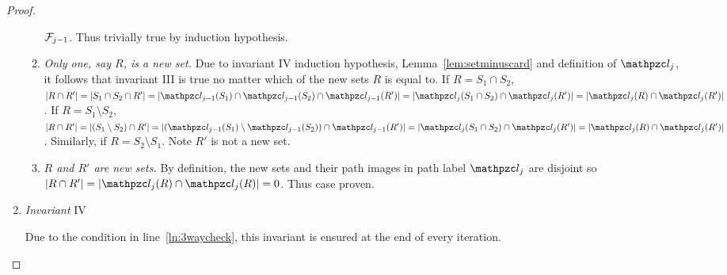 \begin{proof}
\begin{enumerate}[\xbullet]
\begin{enumerate}[{III}a $|$]
      ${\cal F}_{j-1}$. Thus trivially true by induction hypothesis.
    \item {\em Only one, say $R$, is a new set.} Due to invariant IV
      induction hypothesis, Lemma~\ref{lem:setminuscard} and
      definition of $\cl_j$, it follows that invariant III is true no
      matter which of the new sets $R$ is equal to. If $R = S_1 \cap
      S_2$, $|R \cap R'| = |S_1 \cap S_2 \cap R'| = |\cl_{j-1}(S_1)
      \cap \cl_{j-1}(S_2) \cap \cl_{j-1}(R')| = |\cl_j(S_1 \cap S_2)
      \cap \cl_j(R')| = |\cl_j(R) \cap \cl_j(R')|$.  If $R = S_1
      \setminus S_2$, $|R \cap R'| = |(S_1 \setminus S_2) \cap R'| =
      |(\cl_{j-1}(S_1) \setminus \cl_{j-1}(S_2)) \cap \cl_{j-1}(R')| =
      |\cl_{j}(S_1 \cap S_2) \cap \cl_{j}(R')| = |\cl_{j}(R) \cap
      \cl_{j}(R')|$. Similarly, if $R = S_2 \setminus
      S_1$. Note $R'$ is not a new set.\\

    \item {\em $R$ and $R'$ are new sets.} By definition, the new sets
      and their path images in path label $\cl_j$ are disjoint so $|R
      \cap R'| = |\cl_j(R) \cap \cl_j(R)| = 0$. Thus case proven.
    \end{enumerate}
  \item {\em Invariant} IV
    
    Due to the condition in line~\ref{ln:3waycheck}, this invariant is
    ensured at the end of every iteration.
  \end{enumerate} %

\end{proof}

